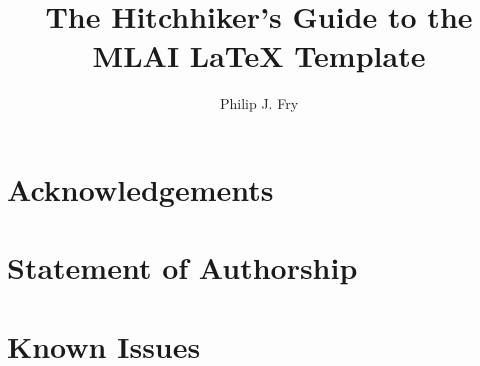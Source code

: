 \documentclass[ba,logo]{mlai-thesis}
\title{The Hitchhiker's Guide to the MLAI \LaTeX{} Template}
\author{Philip J. Fry\\\birthinfo{August 14, 1974 in Brooklyn, New York}}
\begin{document}
	
	\frontmatter 
	
	\maketitle 
	
	\cleardoublepage
	\begin{abstract}
		\blindtext[3]
	\end{abstract}

	\chapter*{Acknowledgements}  
	
	\cleardoublepage
	\chapter*{Statement of Authorship} 
	 
	
	\cleardoublepage
	\tableofcontents
	
	
	\mainmatter
	
	 
	
	
	
	 
	
	
	
	 
	
	 
	
	\backmatter
	
	\printbibliography[heading=bibintoc]
	
	\listoffigures
	
	\listoftables
	
	\appendix
	
	\chapter{Known Issues}  
	
\end{document}
